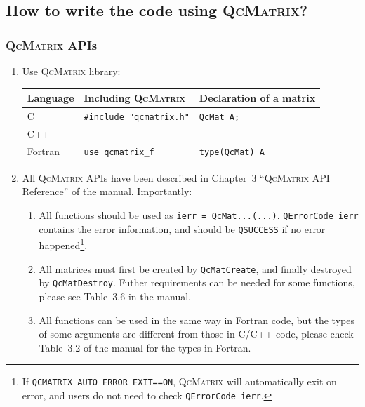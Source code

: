 \documentclass[10pt]{beamer}
\begin{document}
{{\subsection{How to write the code using \textsc{QcMatrix}?}
\label{section-how-to-code}

\begin{frame}[fragile]
  \frametitle<presentation>{\textsc{QcMatrix} APIs}
  \begin{enumerate}
    \item Use \textsc{QcMatrix} library:
      \begin{table}[hbtp]
        \centering
        \label{tab-QcMatrix-use}
        \begin{tabular}{l|l|l}
          \hline\hline
          \textbf{Language} & \textbf{Including \textsc{QcMatrix}} & \textbf{Declaration of a matrix}\\
          \hline
          C & \verb|#include "qcmatrix.h"| & \verb|QcMat A;|\\
          \hline
          C++ & &\\
          \hline
          Fortran & \verb|use qcmatrix_f| & \verb|type(QcMat) A|\\
          \hline\hline
        \end{tabular}
      \end{table}
    \item All \textsc{QcMatrix} APIs have been described in Chapter~3 ``\textsc{QcMatrix} API
      Reference'' of the manual. Importantly:
      \begin{enumerate}
        \item All functions should be used as \verb|ierr = QcMat...(...)|. \verb|QErrorCode ierr|
          contains the error information, and should be \verb|QSUCCESS| if no error
          happened\footnote{If \texttt{QCMATRIX\_AUTO\_ERROR\_EXIT==ON}, \textsc{QcMatrix} will
          automatically exit on error, and users do not need to check \texttt{QErrorCode ierr}.}.
        \item All matrices must first be created by \verb|QcMatCreate|, and finally
          destroyed by \verb|QcMatDestroy|. Futher requirements can be needed for some
          functions, please see Table~3.6 in the manual.
        \item All functions can be used in the same way in Fortran code, but the types
          of some arguments are different from those in C/C++ code, please check Table~3.2
          of the manual for the types in Fortran.
      \end{enumerate}
  \end{enumerate}
\end{frame}

}}
\end{document}
